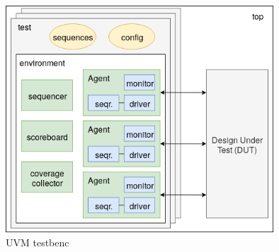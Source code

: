 \begin{figure}[h!]
  \centering
  \includegraphics[width=100mm]{img/v5_typical_tb.png}
  \caption{UVM testbenc}
  \label{fig:typical_tb}
\end{figure}

